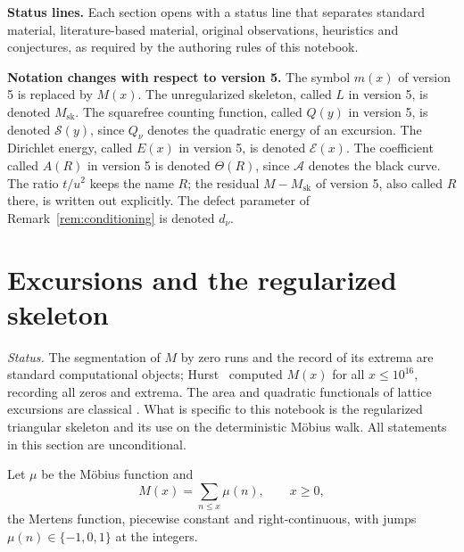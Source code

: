 \documentclass[11pt]{amsart}
\numberwithin{equation}{section}
\theoremstyle{plain}
\theoremstyle{definition}
\theoremstyle{remark}
\newcommand{\Msk}{M_{\mathrm{sk}}}
\newcommand{\Anet}{\mathcal{A}}
\newcommand{\Sq}{\mathcal{S}}
\newcommand{\En}{\mathcal{E}}
\begin{document}
\medskip
\noindent\textbf{Status lines.} Each section opens with a status line that
separates standard material, literature-based material, original
observations, heuristics and conjectures, as required by the authoring rules
of this notebook.

\medskip
\noindent\textbf{Notation changes with respect to version 5.} The symbol
$m(x)$ of version 5 is replaced by $M(x)$. The unregularized skeleton, called
$L$ in version 5, is denoted $\Msk$. The squarefree counting function, called
$Q(y)$ in version 5, is denoted $\Sq(y)$, since $Q_\nu$ denotes the quadratic
energy of an excursion. The Dirichlet energy, called $E(x)$ in version 5, is
denoted $\En(x)$. The coefficient called $A(R)$ in version 5 is denoted
$\Theta(R)$, since $\Anet$ denotes the black curve. The ratio $t/u^2$ keeps
the name $R$; the residual $M-\Msk$ of version 5, also called $R$ there, is
written out explicitly. The defect parameter of
Remark~\ref{rem:conditioning} is denoted $d_\nu$.


\section{Excursions and the regularized skeleton}
\label{sec:definitions}

\noindent\emph{Status.} The segmentation of $M$ by zero runs and the record
of its extrema are standard computational objects; Hurst~\cite{Hurst18}
computed $M(x)$ for all $x\le10^{16}$, recording all zeros and extrema.  The
area and quadratic functionals of lattice excursions are classical
\cite{Takacs91,NguyenThe04,Richard05,Janson07,DKW15,CP17}.  What is specific
to this notebook is the regularized triangular skeleton and its use on the
deterministic M\"obius walk.  All statements in this section are
unconditional.

\medskip

Let $\mu$ be the M\"obius function and
\begin{equation}
\label{eq:mertens_def}
M(x)=\sum_{n\le x}\mu(n),\qquad x\ge0,
\end{equation}
the Mertens function, piecewise constant and right-continuous, with jumps
$\mu(n)\in\{-1,0,1\}$ at the integers.
\end{document}
